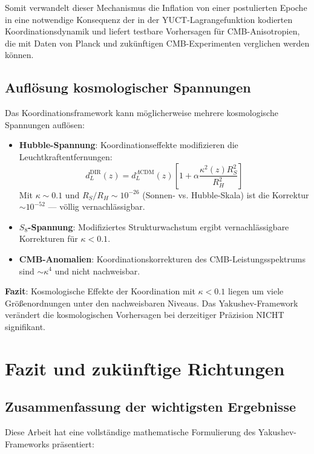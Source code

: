 \documentclass[11pt,a4paper]{article}
\begin{document}
	Somit verwandelt dieser Mechanismus die Inflation von einer postulierten Epoche in eine notwendige Konsequenz der in der YUCT-Lagrangefunktion kodierten Koordinationsdynamik und liefert testbare Vorhersagen für CMB-Anisotropien, die mit Daten von Planck und zukünftigen CMB-Experimenten verglichen werden können.
	
	\subsection{Auflösung kosmologischer Spannungen}
	
	Das Koordinationsframework kann möglicherweise mehrere kosmologische Spannungen auflösen:
	
	\begin{itemize}
		\item \textbf{Hubble-Spannung}: Koordinationseffekte modifizieren die Leuchtkraftentfernungen:
		\begin{equation}
			d_L^{\text{DIR}}(z) = d_L^{\Lambda\text{CDM}}(z) \left[ 1 + \alpha \frac{\kappa^2(z) R_S^2}{R_H^2} \right]
		\end{equation}
		Mit $\kappa \sim 0.1$ und $R_S/R_H \sim 10^{-26}$ (Sonnen- vs. Hubble-Skala) ist die Korrektur $\sim 10^{-52}$ — völlig vernachlässigbar.
		
		\item \textbf{$S_8$-Spannung}: Modifiziertes Strukturwachstum ergibt vernachlässigbare Korrekturen für $\kappa < 0.1$.
		
		\item \textbf{CMB-Anomalien}: Koordinationskorrekturen des CMB-Leistungsspektrums sind $\sim \kappa^4$ und nicht nachweisbar.
	\end{itemize}
	
	\textbf{Fazit}: Kosmologische Effekte der Koordination mit $\kappa < 0.1$ liegen um viele Größenordnungen unter den nachweisbaren Niveaus. Das Yakushev-Framework verändert die kosmologischen Vorhersagen bei derzeitiger Präzision NICHT signifikant.
	
	\section{Fazit und zukünftige Richtungen}
	\subsection{Zusammenfassung der wichtigsten Ergebnisse}
	
	Diese Arbeit hat eine vollständige mathematische Formulierung des Yakushev-Frameworks präsentiert:
	
\end{document}
